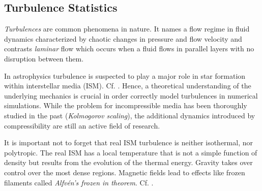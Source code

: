 \subsection{Turbulence Statistics}
\label{sec:turbulence}

\emph{Turbulences} are common phenomena in nature. It names a flow regime in
fluid dynamics characterized by chaotic changes in pressure and flow velocity
and contrasts \emph{laminar} flow which occurs when a fluid flows in parallel
layers with no disruption between them.

In astrophysics turbulence is suspected to play a major role in star formation
within interstellar media (ISM). Cf. \cite{klessen2016physical}.  Hence, a
theoretical understanding of the underlying mechanics is crucial in order
correctly model turbulences in numerical simulations. While the problem for
incompressible media has been thoroughly studied in the past (\emph{Kolmogorov
scaling}), the additional dynamics introduced by compressibility are still an
active field of research.

It is important not to forget that real ISM turbulence is neither isothermal,
nor polytropic. The real ISM has a local temperature that is not a simple
function of density but results from the evolution of the thermal energy.
Gravity takes over control over the most dense regions. Magnetic fields lead to
effects like frozen filaments called \emph{Alfvén's frozen in theorem}. Cf.
\cite{roberts2007alfven}.

% 

